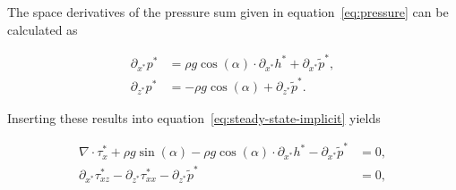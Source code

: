 The space derivatives of the pressure sum given in equation~\eqref{eq:pressure} can be calculated as

\begin{equation} \label{eq:pressure-space-derivative}
  \begin{split}
  \partial_{x^*} p^* &= \rho g \cos(\alpha) \cdot \partial_{x^*} h^* + \partial_{x^*} \tilde{p}^*, \\
  \partial_{z^*} p^* &= - \rho g \cos(\alpha) + \partial_{z^*} \tilde{p}^*.
  \end{split}
\end{equation}

Inserting these results into equation~\eqref{eq:steady-state-implicit} yields

\begin{equation} \label{eq:steady-state-explicit}
  \begin{split}
    \nabla \cdot \tau_x^* + \rho g \sin(\alpha) - \rho g \cos(\alpha) \cdot \partial_{x^*} h^* - \partial_{x^*} \tilde{p}^* &= 0, \\
    \partial_{x^*} \tau_{xz}^* - \partial_{z^*} \tau_{xx}^* - \partial_{z^*} \tilde{p}^* &= 0,
  \end{split}
\end{equation}




